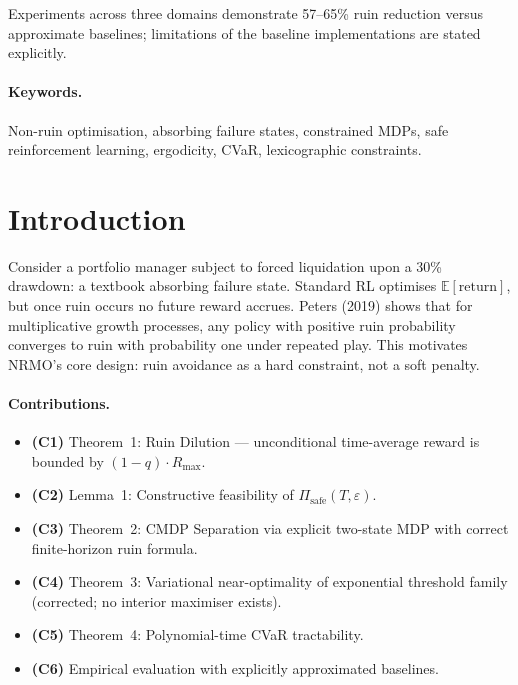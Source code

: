 Experiments across three domains demonstrate 57--65\% ruin reduction
versus approximate baselines; limitations of the baseline
implementations are stated explicitly.

\paragraph{Keywords.}
Non-ruin optimisation, absorbing failure states, constrained MDPs,
safe reinforcement learning, ergodicity, CVaR, lexicographic
constraints.

\section{Introduction}
\label{sec:arxiv-introduction}

Consider a portfolio manager subject to forced liquidation upon a
30\% drawdown: a textbook absorbing failure state. Standard RL
optimises $\mathbb{E}[\mathrm{return}]$, but once ruin occurs no
future reward accrues. Peters (2019) shows that for multiplicative
growth processes, any policy with positive ruin probability
converges to ruin with probability one under repeated play. This
motivates NRMO's core design: ruin avoidance as a hard constraint,
not a soft penalty.

\paragraph{Contributions.}

\begin{itemize}
\item \textbf{(C1)} Theorem~1: Ruin Dilution --- unconditional
time-average reward is bounded by $(1 - q) \cdot R_{\max}$.
\item \textbf{(C2)} Lemma~1: Constructive feasibility of
$\Pi_{\mathrm{safe}}(T, \varepsilon)$.
\item \textbf{(C3)} Theorem~2: CMDP Separation via explicit two-state
MDP with correct finite-horizon ruin formula.
\item \textbf{(C4)} Theorem~3: Variational near-optimality of
exponential threshold family (corrected; no interior maximiser
exists).
\item \textbf{(C5)} Theorem~4: Polynomial-time CVaR tractability.
\item \textbf{(C6)} Empirical evaluation with explicitly approximated
baselines.
\end{itemize}

